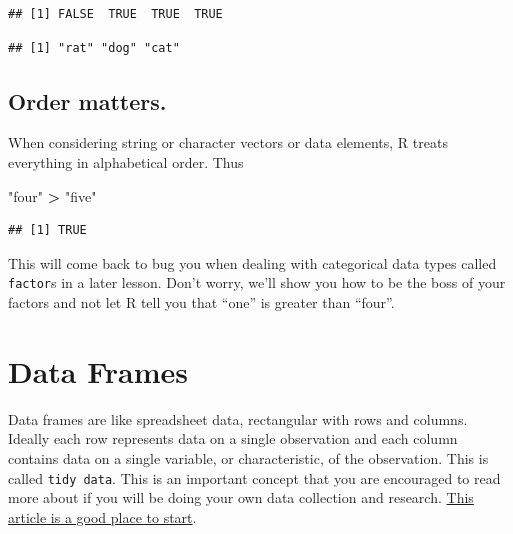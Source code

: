 \documentclass[
]{article}
\newenvironment{Shaded}{\begin{snugshade}}{\end{snugshade}}
\newcommand{\KeywordTok}[1]{\textcolor[rgb]{0.13,0.29,0.53}{\textbf{#1}}}
\newcommand{\NormalTok}[1]{#1}
\newcommand{\OperatorTok}[1]{\textcolor[rgb]{0.81,0.36,0.00}{\textbf{#1}}}
\newcommand{\StringTok}[1]{\textcolor[rgb]{0.31,0.60,0.02}{#1}}
\begin{document}
\begin{verbatim}
## [1] FALSE  TRUE  TRUE  TRUE
\end{verbatim}

\begin{Shaded}
\end{Shaded}

\begin{verbatim}
## [1] "rat" "dog" "cat"
\end{verbatim}

\hypertarget{order-matters.}{%
\subsection{Order matters.}\label{order-matters.}}

When considering string or character vectors or data elements, R treats
everything in alphabetical order. Thus

\begin{Shaded}
\begin{Highlighting}[]
\StringTok{"four"} \OperatorTok{>}\StringTok{ "five"}
\end{Highlighting}
\end{Shaded}

\begin{verbatim}
## [1] TRUE
\end{verbatim}

This will come back to bug you when dealing with categorical data types
called \texttt{factor}s in a later lesson. Don't worry, we'll show you
how to be the boss of your factors and not let R tell you that ``one''
is greater than ``four''.

\hypertarget{data-frames}{%
\section{Data Frames}\label{data-frames}}

Data frames are like spreadsheet data, rectangular with rows and
columns. Ideally each row represents data on a single observation and
each column contains data on a single variable, or characteristic, of
the observation. This is called \texttt{tidy\ data}. This is an
important concept that you are encouraged to read more about if you will
be doing your own data collection and research.
\href{https://www.jstatsoft.org/article/view/v059i10}{This article is a
good place to start}.
\end{document}
